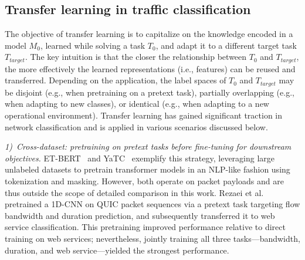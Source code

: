 \documentclass[lettersize,journal,twoside,article]{IEEEtran}
\begin{document}
\subsection{Transfer learning in traffic classification }
The objective of transfer learning is to capitalize on the knowledge encoded in a model $M_{0}$, learned while solving a task $T_{0}$, and adapt it to a different target task $T_{target}$. The key intuition is that the closer the relationship between $T_{0}$ and $T_{target}$, the more effectively the learned representations (i.e., features) can be reused and transferred. Depending on the application, the label spaces of $T_{0}$ and $T_{target}$ may be disjoint (e.g., when pretraining on a pretext task), partially overlapping (e.g., when adapting to new classes), or identical (e.g., when adapting to a new operational environment). Transfer learning has gained significant traction in network classification and is applied in various scenarios discussed below.

\textit{1)~Cross-dataset: pretraining on pretext tasks before fine-tuning for downstream objectives.} ET-BERT~\cite{lin2022Etbert} and YaTC~\cite{Zhao2023Yatc} exemplify this strategy, leveraging large unlabeled datasets to pretrain transformer models in an NLP-like fashion using tokenization and masking. However, both operate on packet payloads and are thus outside the scope of detailed comparison in this work. Rezaei et al.~\cite{Rezaei2020Multitask} pretrained a 1D-CNN on QUIC packet sequences via a pretext task targeting flow bandwidth and duration prediction, and subsequently transferred it to web service classification. This pretraining improved performance relative to direct training on web services; nevertheless, jointly training all three tasks---bandwidth, duration, and web service---yielded the strongest performance. 
\end{document}
